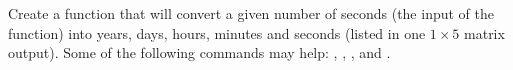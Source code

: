 {Create a function that will convert a given number of seconds (the input of the function) into years, days, hours, minutes and seconds (listed in one $1 \times 5$ matrix output).  Some of the following commands may help: , , , and .}
{}